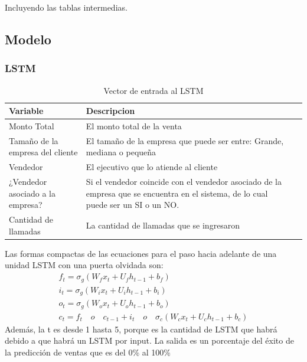 \documentclass[conference]{IEEEtran}
\begin{document}
Incluyendo las tablas intermedias.\\

\subsection{Modelo}

\subsubsection{LSTM}

\begin{table}[h]
    \caption{Vector de entrada al LSTM}
    \centering
    \begin{tabularx}{0.4\textwidth} {
            | >{\raggedright\arraybackslash}X
            | >{\centering\arraybackslash}X
            | >{\raggedleft\arraybackslash}X |}
        \hline
        Variable              & Descripcion                             \\
        \hline
        Monto Total           & El monto total de la venta     \\
        \hline
        Tamaño de la empresa del cliente
                              &
        El tamaño de la empresa
        que puede ser entre:
        Grande, mediana o
        pequeña                                                           \\
        \hline
        Vendedor              &
        El ejecutivo que lo atiende
        al cliente                                                        \\
        \hline
        ¿Vendedor asociado a la
        empresa?              &
        Si el vendedor coincide
        con el vendedor asociado
        de la empresa que se
        encuentra en el sistema,
        de lo cual puede ser un SI
        o un NO.                                                          \\
        \hline
        Cantidad de llamadas  & La cantidad de llamadas
        que se ingresaron                                                           \\
        \hline
    \end{tabularx}
    \label{tab2}
\end{table}
Las formas compactas de las ecuaciones para el paso hacia adelante de una unidad LSTM con una puerta olvidada son: \\
\begin{gather*}
    f_{t} =\sigma_{g}(W_{f}x_{t}+U_{f}h_{t-1}+b_{f})\\
    i_{t} = \sigma_{g}(W_{i}x_{t}+U_{i}h_{t-1}+b_{i})\\
    o_{t} = \sigma_{g}(W_{o}x_{t}+U_{o}h_{t-1}+b_{o})\\
    c_{t} = f_{t} \quad o  \quad c_{t-1}+i_{t}  \quad o  \quad \sigma_{c}(W_{c}x_{t}+U_{c}h_{t-1}+b_{c})
\end{gather*}
Además, la t es desde 1 hasta 5, porque es la cantidad de LSTM que habrá debido a que habrá un LSTM por input. La salida es un porcentaje del éxito de la predicción de ventas que es del 0\% al 100\%
\end{document}

